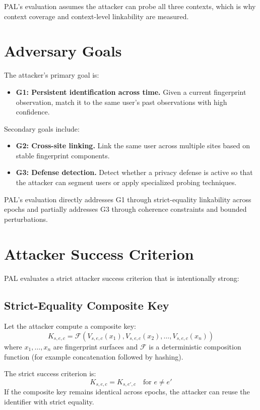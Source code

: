 \documentclass[11pt]{report}
\begin{document}
PAL’s evaluation assumes the attacker can probe all three contexts, which is why context coverage and context-level linkability are measured.

\section{Adversary Goals}

The attacker’s primary goal is:

\begin{itemize}
    \item \textbf{G1: Persistent identification across time.} Given a current fingerprint observation, match it to the same user’s past observations with high confidence.
\end{itemize}

Secondary goals include:

\begin{itemize}
    \item \textbf{G2: Cross-site linking.} Link the same user across multiple sites based on stable fingerprint components.
    \item \textbf{G3: Defense detection.} Detect whether a privacy defense is active so that the attacker can segment users or apply specialized probing techniques.
\end{itemize}

PAL’s evaluation directly addresses G1 through strict-equality linkability across epochs and partially addresses G3 through coherence constraints and bounded perturbations.

\section{Attacker Success Criterion}

PAL evaluates a strict attacker success criterion that is intentionally strong:

\subsection{Strict-Equality Composite Key}

Let the attacker compute a composite key:
\[
K_{s,e,c} = \mathcal{F}\left(V_{s,e,c}(x_1), V_{s,e,c}(x_2), \dots, V_{s,e,c}(x_n)\right)
\]
where $x_1,\dots,x_n$ are fingerprint surfaces and $\mathcal{F}$ is a deterministic composition function (for example concatenation followed by hashing).

The strict success criterion is:
\[
K_{s,e,c} = K_{s,e',c}
\quad \text{for } e \neq e'
\]
If the composite key remains identical across epochs, the attacker can reuse the identifier with strict equality.
\end{document}
